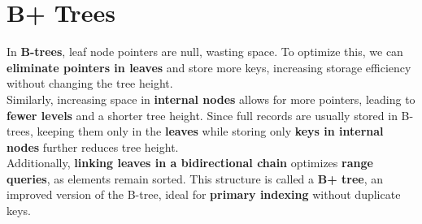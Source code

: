 \documentclass{report}
\begin{document}
\chapter{B+ Trees}
In \textbf{B-trees}, leaf node pointers are null, wasting space. To optimize this, we can \textbf{eliminate pointers in leaves} and store more keys, increasing storage efficiency without changing the tree height.  
\smallskip \\Similarly, increasing space in \textbf{internal nodes} allows for more pointers, leading to \textbf{fewer levels} and a shorter tree height. Since full records are usually stored in B-trees, keeping them only in the \textbf{leaves} while storing only \textbf{keys in internal nodes} further reduces tree height.  
\smallskip \\Additionally, \textbf{linking leaves in a bidirectional chain} optimizes \textbf{range queries}, as elements remain sorted. This structure is called a \textbf{B+ tree}, an improved version of the B-tree, ideal for \textbf{primary indexing} without duplicate keys.  
\end{document}
